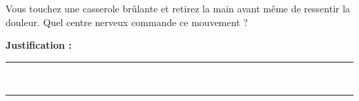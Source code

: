 Vous touchez une casserole brûlante et retirez la main avant même de ressentir la douleur. Quel centre nerveux commande ce mouvement ?

\choices

\noindent\textbf{Justification :} \hrulefill \\[2.5ex]
\rule{\linewidth}{0.4pt} \\[2.5ex]
\rule{\linewidth}{0.4pt}
\vfill
